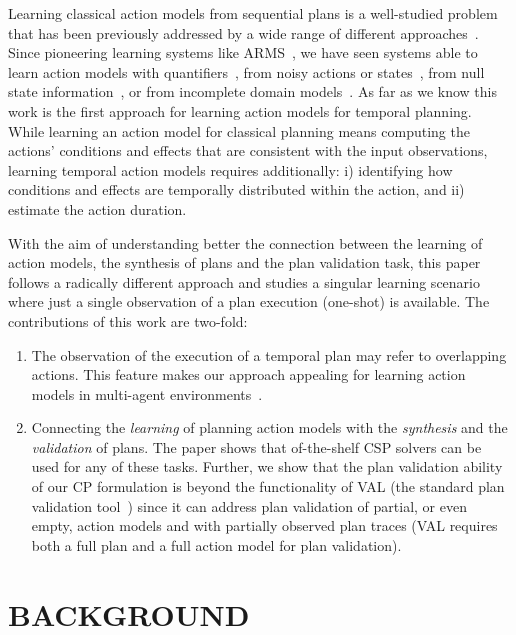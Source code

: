 \documentclass{ecai}
\begin{document}
Learning classical action models from sequential plans is a well-studied problem that has been previously addressed by a wide range of different approaches~\cite{arora2018review}. Since pioneering learning systems like ARMS~\cite{yang2007learning}, we have seen systems able to learn action models with quantifiers~\cite{AmirC08,ZhuoYHL10}, from noisy actions or states~\cite{MouraoZPS12,zhuo2013action}, from null state information~\cite{cresswell2013}, or from incomplete domain models~\cite{ZhuoK17,ZhuoNK13}. As far as we know this work is the first approach for learning action models for temporal planning. While learning an action model for classical planning means computing the actions' conditions and effects that are consistent with the input observations, learning temporal action models requires additionally: i) identifying how conditions and effects are temporally distributed within the action, and ii) estimate the action duration. 

With the aim of understanding better the connection between the learning of action models, the synthesis of plans and the plan validation task, this paper follows a radically different approach and studies a singular learning scenario where just a single observation of a plan execution (one-shot) is available. The contributions of this work are two-fold:

\begin{enumerate}  
\item The observation of the execution of a temporal plan may refer to overlapping actions. This feature makes our approach appealing for learning action models in multi-agent environments~\cite{furelos2018carpool}. 
\item Connecting the {\em learning} of planning action models with the {\em synthesis} and the {\em validation} of plans. The paper shows that of-the-shelf CSP solvers can be used for any of these tasks. Further, we show that the plan validation ability of our CP formulation is beyond the functionality of VAL (the standard plan validation tool~\cite{howey2004val}) since it can address plan validation of partial, or even empty, action models and with partially observed plan traces (VAL requires both a full plan and a full action model for plan validation). 
\end{enumerate}



\section{BACKGROUND}
\end{document}

